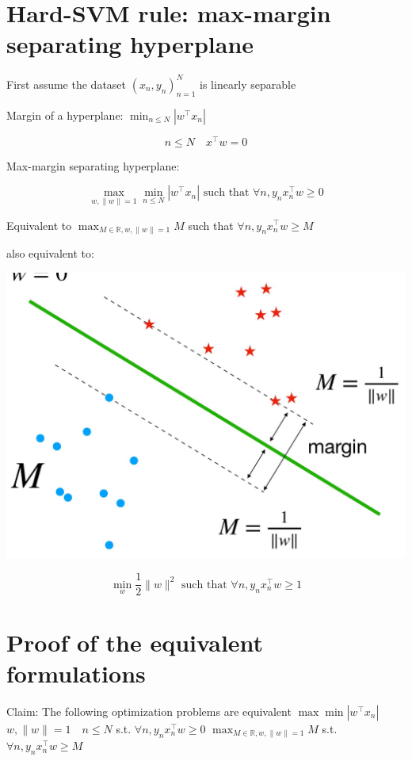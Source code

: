 \documentclass[10pt]{article}
\begin{document}
\section*{Hard-SVM rule: max-margin separating hyperplane}
First assume the dataset $\left(x_{n}, y_{n}\right)_{n=1}^{N}$ is linearly separable

Margin of a hyperplane: $\min _{n \leq N}\left|w^{\top} x_{n}\right|$

$$
n \leq N \quad x^{\top} w=0
$$

Max-margin separating hyperplane:

$$
\max _{w,\|w\|=1} \min _{n \leq N}\left|w^{\top} x_{n}\right| \text { such that } \forall n, y_{n} x_{n}^{\top} w \geq 0
$$

Equivalent to $\max _{M \in \mathbb{R}, w,\|w\|=1} M$ such that $\forall n, y_{n} x_{n}^{\top} w \geq M$

also equivalent to:

\begin{center}
\includegraphics[max width=\textwidth]{2023_12_30_bf5d191916c1e78fa6d6g-06}
\end{center}

$$
\min _{w} \frac{1}{2}\|w\|^{2} \text { such that } \forall n, y_{n} x_{n}^{\top} w \geq 1
$$

\section*{Proof of the equivalent formulations}
Claim: The following optimization problems are equivalent
$\max \min \left|w^{\top} x_{n}\right|$
$w,\|w\|=1 \quad n \leq N$
s.t. $\forall n, y_{n} x_{n}^{\top} w \geq 0$
$\max _{M \in \mathbb{R}, w,\|w\|=1} M$
s.t. $\forall n, y_{n} x_{n}^{\top} w \geq M$
\end{document}
